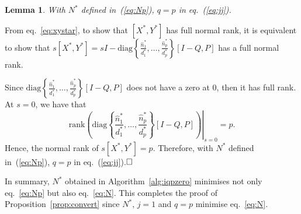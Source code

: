 \documentclass[twocolumn,12pt]{autart}
\theoremstyle{plain}
\newtheorem{lemma}{Lemma}
\newenvironment{proof}[1][Proof]{\begin{trivlist} \item[\hskip \labelsep {\bfseries #1}]}{\end{trivlist}}
\begin{document}
\begin{lemma}
With $N^*$ defined in~(\ref{eq:Np}), $q=p$ in eq.~(\ref{eq:jj}).
\end{lemma}
\begin{proof}
From eq.~\eqref{eq:xystar}, to show that $[X^*,Y^*]$ has full normal rank, it is equivalent to show that 
$s[X^*,Y^*]= sI-\text{diag}\left\{\frac{\hat{n}^*_1}{d^*_1},\ldots,\frac{\hat{n}^*_p}{d^*_p}\right\}[I-Q,P]$ has a full normal rank. 

Since $\text{diag}\left\{\frac{\hat{n}^*_1}{d^*_1},\ldots,\frac{\hat{n}^*_p}{d^*_p}\right\}[I-Q,P]$ does not have a zero at $0$, then it has full rank. At $s=0$, we have that
\begin{equation}
\left. \text{rank}\left(\text{diag}\left\{\frac{\hat{n}^*_1}{d^*_1},\ldots,\frac{\hat{n}^*_p}{d^*_p}\right\}[I-Q,P]\right)\right\vert_{s=0}=p.
\end{equation}
Hence, the normal rank of $s[X^*,Y^*]=p$. Therefore, with $N^*$ defined in~(\ref{eq:Np}), $q=p$ in eq.~(\ref{eq:jj}).$\hfill \square$
\end{proof}


In summary, $N^*$ obtained in Algorithm~\ref{alg:iqpzero} minimises not only eq.~\eqref{eq:Np} but also eq.~\eqref{eq:N}. This completes the proof of Proposition~\ref{prop:convert} since  $N^*$, $j=1$ and $q=p$ minimise eq.~\eqref{eq:N}.
\end{document}
